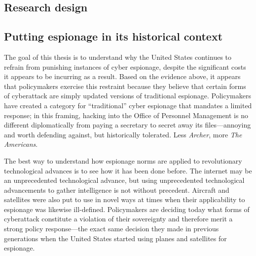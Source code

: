 \documentclass[11pt]{memoir}
\begin{document}
\begin{refsegment}


\section{Research design}
\subsection{Putting espionage in its historical context}
The goal of this thesis is to understand why the United States continues to refrain from punishing instances of cyber espionage, despite the significant costs it appears to be incurring as a result. Based on the evidence above, it appears that policymakers exercise this restraint because they believe that certain forms of cyberattack are simply updated versions of traditional espionage. Policymakers have created a category for ``traditional'' cyber espionage that mandates a limited response; in this framing, hacking into the Office of Personnel Management is no different diplomatically from paying a secretary to secret away its files---annoying and worth defending against, but historically tolerated. Less \emph{Archer}, more \emph{The Americans}.

The best way to understand how espionage norms are applied to revolutionary technological advances is to see how it has been done before. The internet may be an unprecedented technological advance, but using unprecedented technological advancements to gather intelligence is not without precedent. Aircraft and satellites were also put to use in novel ways at times when their applicability to espionage was likewise ill-defined. Policymakers are deciding today what forms of cyberattack constitute a violation of their sovereignty and therefore merit a strong policy response---the exact same decision they made in previous generations when the United States started using planes and satellites for espionage.


\end{refsegment}
\end{document}
